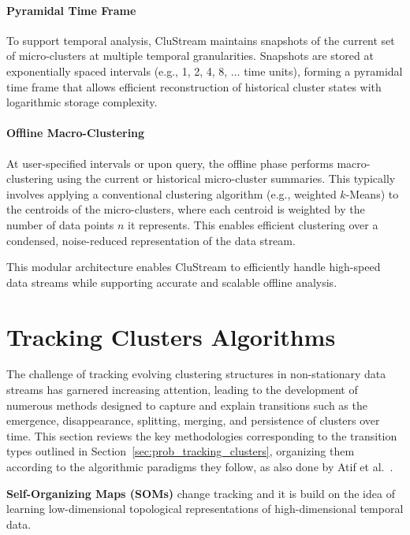 \paragraph{Pyramidal Time Frame} To support temporal analysis, CluStream maintains snapshots of the current set
of micro-clusters at multiple temporal granularities. Snapshots are stored at
exponentially spaced intervals (e.g., 1, 2, 4, 8, $\dots$ time units), forming
a pyramidal time frame that allows efficient reconstruction of historical
cluster states with logarithmic storage complexity.

\paragraph{Offline Macro-Clustering} At user-specified intervals or upon query, the offline phase performs
macro-clustering using the current or historical micro-cluster summaries. This
typically involves applying a conventional clustering algorithm (e.g., weighted
$k$-Means) to the centroids of the micro-clusters, where each centroid is
weighted by the number of data points $n$ it represents. This enables efficient
clustering over a condensed, noise-reduced representation of the data stream.

This modular architecture enables CluStream to efficiently handle high-speed
data streams while supporting accurate and scalable offline analysis.



\section{Tracking Clusters Algorithms}\label{sec:tracking_clusters_algorithms}

The challenge of tracking evolving clustering structures in non-stationary data
streams has garnered increasing attention, leading to the development of
numerous methods designed to capture and explain transitions such as the
emergence, disappearance, splitting, merging, and persistence of clusters over
time. This section reviews the key methodologies corresponding to the
transition types outlined in Section~\ref{sec:prob_tracking_clusters},
organizing them according to the algorithmic paradigms they follow, as also
done by Atif et al.~\cite{tracking_review}.

\textbf{Self-Organizing Maps (SOMs)} change tracking and it is build on the idea of
learning low-dimensional topological representations of high-dimensional temporal data.

